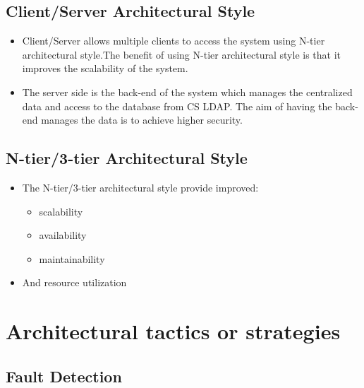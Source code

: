 \documentclass[12pt, oneside]{article}
\begin{document}
	\subsection{Client/Server Architectural Style}
	\begin{itemize}
		\item Client/Server allows multiple clients to access the system using N-tier 		architectural style.The benefit of using N-tier architectural style is that it improves the scalability of the system.
		\item The server side is the back-end of the system which manages the centralized data and access to the database from CS LDAP. The aim of having the back-end manages the data is to achieve higher security.
	\end{itemize}
	\subsection{N-tier/3-tier Architectural Style}
	\begin{itemize}
		\item The N-tier/3-tier architectural style provide improved:
		\begin{itemize}
			\item scalability
			\item availability
			\item maintainability
		\end{itemize}
		\item And resource utilization
	\end{itemize}
\section{Architectural tactics or strategies}

	
	
	\subsection{Fault Detection}
\end{document}
